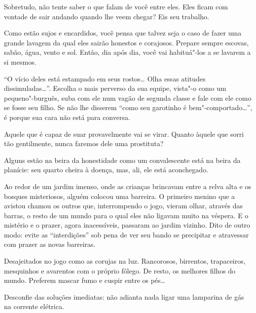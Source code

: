 Sobretudo, não tente saber o que falam de você entre eles. Eles ficam
com vontade de sair andando quando lhe veem chegar? Eis seu trabalho.

\bigskip
\bigskip

Como estão sujos e encardidos, você pensa que talvez seja o caso de
fazer uma grande lavagem da qual eles sairão honestos e corajosos.
Prepare sempre escovas, sabão, água, vento e sol. Então, dia após dia,
você vai habituá"-los a se lavarem a si mesmos.

\bigskip
\bigskip

``O vício deles está estampado em seus rostos\ldots{} Olha essas atitudes
dissimuladas\ldots{}''. Escolha o mais perverso da sua equipe, vista"-o como
um pequeno"-burguês, suba com ele num vagão de segunda classe e fale com
ele como se fosse seu filho. Se não lhe disserem ``como seu garotinho é
bem"-comportado\ldots{}'', é porque sua cara não está para conversa.

\bigskip
\bigskip

Aquele que é capaz de suar provavelmente vai se virar. Quanto àquele que
sorri tão gentilmente, nunca faremos dele uma prostituta?

\bigskip
\bigskip

Alguns estão na beira da honestidade como um convalescente está na beira
da planície: seu quarto cheira à doença, mas, ali, ele está aconchegado.

\bigskip
\bigskip

Ao redor de um jardim imenso, onde as crianças brincavam entre a relva
alta e os bosques misteriosos, alguém colocou uma barreira. O primeiro
menino que a avistou chamou os outros que, interrompendo o jogo, vieram
olhar, através das barras, o resto de um mundo para o qual eles não
ligavam muito na véspera. E o mistério e o prazer, agora inacessíveis,
passaram ao jardim vizinho. Dito de outro modo: evite as ``interdições''
sob pena de ver seu bando se precipitar e atravessar com prazer as novas
barreiras.

\bigskip
\bigskip

Desajeitados no jogo como as corujas na luz. Rancorosos, birrentos,
trapaceiros, mesquinhos e avarentos com o próprio fôlego. De resto, os
melhores filhos do mundo. Preferem mascar fumo e cuspir entre os pés\ldots{}

\bigskip
\bigskip

Desconfie das soluções imediatas: não adianta nada ligar uma lamparina
de gás na corrente elétrica.

